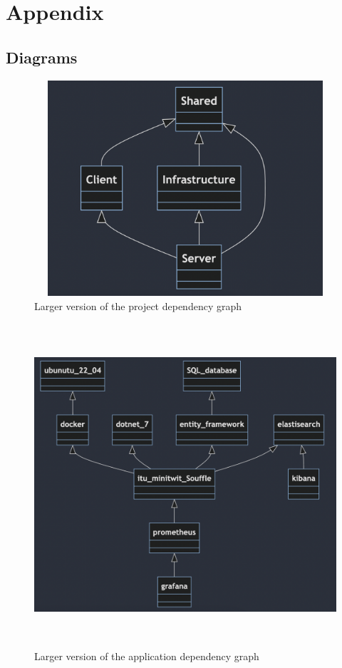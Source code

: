 \section{Appendix}
\subsection{Diagrams}

\begin{figure}[H]
    \centering
    \includegraphics[width = 15.0cm, height = 8.0cm]{Images/onionStructure.png}
    \caption{Larger version of the project dependency graph}
    \label{fig:LargerProjectDependencyGraph}
\end{figure}

\begin{figure}[H]
    \centering
    \includegraphics[width = 15.0cm, height = 12.0cm]{Images/application_dependencies.png}
    \caption{Larger version of the application dependency graph}
    \label{fig:LargerApplicationDependencyGraph}
\end{figure}

